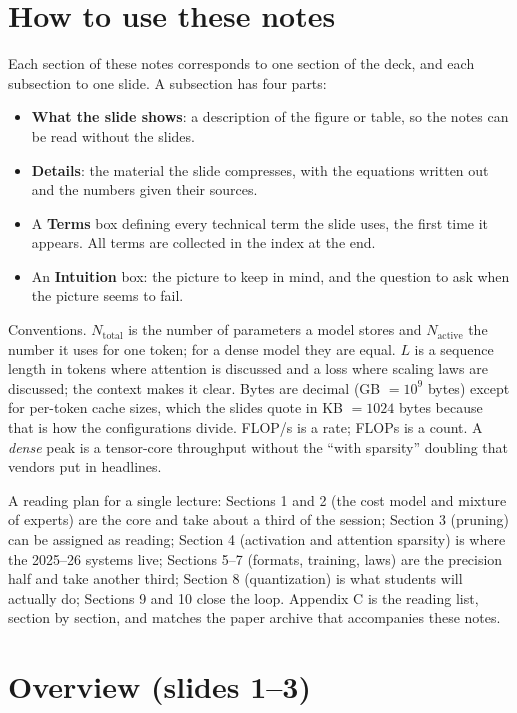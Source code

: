\documentclass[11pt,letterpaper]{article}
\newcommand{\setstage}[1]{\colorlet{stagec}{#1}}
\newcommand{\Nact}{N_{\mathrm{active}}}
\newcommand{\Ntot}{N_{\mathrm{total}}}\newcommand{\Neff}{N_{\mathrm{eff}}}
\begin{document}
\section*{How to use these notes}
Each section of these notes corresponds to one section of the deck, and each subsection to one slide. A subsection has four parts:
\begin{itemize}
  \item \textbf{What the slide shows}: a description of the figure or table, so the notes can be read without the slides.
  \item \textbf{Details}: the material the slide compresses, with the equations written out and the numbers given their sources.
  \item A \textbf{Terms} box defining every technical term the slide uses, the first time it appears. All terms are collected in the index at the end.
  \item An \textbf{Intuition} box: the picture to keep in mind, and the question to ask when the picture seems to fail.
\end{itemize}
Conventions. $\Ntot$ is the number of parameters a model stores and $\Nact$ the number it uses for one token; for a dense model they are equal. $L$ is a sequence length in tokens where attention is discussed and a loss where scaling laws are discussed; the context makes it clear. Bytes are decimal (GB $=10^9$ bytes) except for per-token cache sizes, which the slides quote in KB $=1024$ bytes because that is how the configurations divide. FLOP/s is a rate; FLOPs is a count. A \emph{dense} peak is a tensor-core throughput without the ``with sparsity'' doubling that vendors put in headlines.

A reading plan for a single lecture: Sections 1 and 2 (the cost model and mixture of experts) are the core and take about a third of the session; Section 3 (pruning) can be assigned as reading; Section 4 (activation and attention sparsity) is where the 2025--26 systems live; Sections 5--7 (formats, training, laws) are the precision half and take another third; Section 8 (quantization) is what students will actually do; Sections 9 and 10 close the loop. Appendix C is the reading list, section by section, and matches the paper archive that accompanies these notes.

\setstage{ink}
\section{Overview (slides 1--3)}
\end{document}
